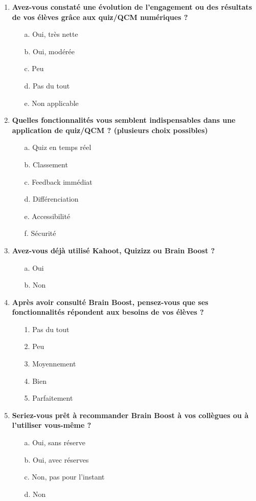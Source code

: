 \documentclass[a4paper,11pt]{report}
\begin{document}
\begin{enumerate}
    \item \textbf{Avez-vous constaté une évolution de l'engagement ou des résultats de vos élèves grâce aux quiz/QCM numériques ?}
    \begin{itemize}
        \item[a.] Oui, très nette
        \item[b.] Oui, modérée
        \item[c.] Peu
        \item[d.] Pas du tout
        \item[e.] Non applicable
    \end{itemize}
    

    \item \textbf{Quelles fonctionnalités vous semblent indispensables dans une application de quiz/QCM ? (plusieurs choix possibles)}
    \begin{itemize}
        \item[a.] Quiz en temps réel
        \item[b.] Classement
        \item[c.] Feedback immédiat
        \item[d.] Différenciation
        \item[e.] Accessibilité
        \item[f.] Sécurité
    \end{itemize}

    \item \textbf{Avez-vous déjà utilisé Kahoot, Quizizz ou Brain Boost ?}
    \begin{itemize}
        \item[a.] Oui
        \item[b.] Non
    \end{itemize}

    \item \textbf{Après avoir consulté Brain Boost, pensez-vous que ses fonctionnalités répondent aux besoins de vos élèves ?}
    \begin{itemize}
        \item[1.] Pas du tout
        \item[2.] Peu
        \item[3.] Moyennement
        \item[4.] Bien
        \item[5.] Parfaitement
    \end{itemize}

    \item \textbf{Seriez-vous prêt à recommander Brain Boost à vos collègues ou à l'utiliser vous-même ?}
    \begin{itemize}
        \item[a.] Oui, sans réserve
        \item[b.] Oui, avec réserves
        \item[c.] Non, pas pour l'instant
        \item[d.] Non
    \end{itemize}
    


\end{enumerate}
\end{document}
